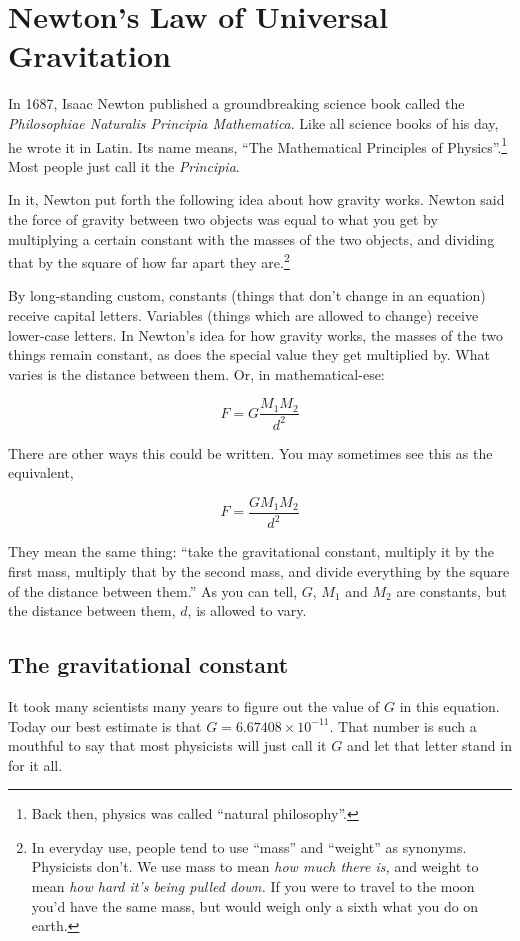 \documentclass[10pt,twocolumn,letterpaper,preprint]{article}
\begin{document}
\section{Newton's Law of Universal Gravitation}

In 1687, Isaac Newton published a groundbreaking science book called the
\textit{Philosophiae Naturalis Principia Mathematica}.  Like all science books
of his day, he wrote it in Latin.  Its name means, ``The Mathematical
Principles of Physics''.\footnote{Back then, physics was called ``natural
philosophy''.}  Most people just call it the \textit{Principia}.

In it, Newton put forth the following idea about how gravity works.  Newton
said the force of gravity between two objects was equal to what you get
by multiplying a certain constant with the masses of the two objects, and
dividing that by the square of how far apart they are.\footnote{
In everyday use, people tend to use ``mass'' and ``weight'' as synonyms.
Physicists don't.  We use mass to mean \textit{how much there is,} and weight
to mean \textit{how hard it's being pulled down.}  If you were to travel to
the moon you'd have the same mass, but would weigh only a sixth what you do
on earth.
}

By long-standing custom, constants (things that don't change in an
equation) receive capital letters.  Variables (things which are allowed
to change) receive lower-case letters.  In Newton's idea for how gravity
works, the masses of the two things remain constant, as does the special value
they get multiplied by.  What varies is the distance between them.  Or, in
mathematical-ese:

\[
F = G\frac{M_1 M_2}{d^2}
\]

There are other ways this could be written.  You may sometimes see this as the
equivalent,

\[
F = \frac{G M_1 M_2}{d^2}
\]

They mean the same thing: ``take the gravitational constant, multiply it by
the first mass, multiply that by the second mass, and divide everything by the
square of the distance between them.''  As you can tell, $G$, $M_1$ and $M_2$
are constants, but the distance between them, $d$, is allowed to vary.

\subsection{The gravitational constant}
It took many scientists many years to figure out the value of $G$ in this
equation.  Today our best estimate is that $G = 6.67408 \times 10^{-11}$.  That
number is such a mouthful to say that most physicists will just call it $G$
and let that letter stand in for it all.
\end{document}

